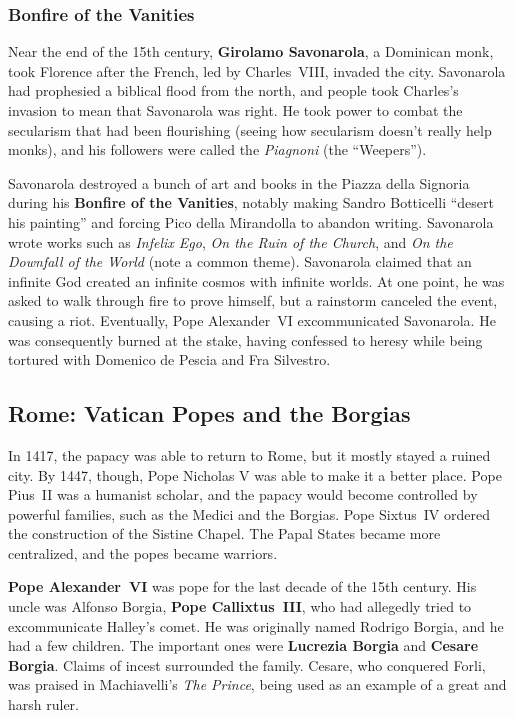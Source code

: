 \subsubsection*{Bonfire of the Vanities}

Near the end of the 15th century, \textbf{Girolamo Savonarola}, a Dominican monk,
took Florence after the French, led by Charles~VIII, invaded the city.
Savonarola had prophesied a biblical flood from the north,
and people took Charles's invasion to mean that Savonarola was right.
He took power to combat the secularism that had been flourishing
(seeing how secularism doesn't really help monks),
and his followers were called the \textit{Piagnoni} (the ``Weepers'').

Savonarola destroyed a bunch of art and books in the Piazza della Signoria
during his \textbf{Bonfire of the Vanities},
notably making Sandro Botticelli ``desert his painting''
and forcing Pico della Mirandolla to abandon writing.
Savonarola wrote works such as
\textit{Infelix Ego},
\textit{On the Ruin of the Church},
and \textit{On the Downfall of the World} (note a common theme).
Savonarola claimed that an infinite God created an infinite cosmos with infinite worlds.
At one point, he was asked to walk through fire to prove himself,
but a rainstorm canceled the event, causing a riot.
Eventually, Pope Alexander~VI excommunicated Savonarola.
He was consequently burned at the stake,
having confessed to heresy while being tortured with Domenico de Pescia and Fra Silvestro.

\subsection*{Rome: Vatican Popes and the Borgias}

In 1417, the papacy was able to return to Rome, but it mostly stayed a ruined city.
By 1447, though, Pope Nicholas V was able to make it a better place.
Pope Pius~II was a humanist scholar, and the papacy would become controlled by powerful families,
such as the Medici and the Borgias.
Pope Sixtus~IV ordered the construction of the Sistine Chapel.
The Papal States became more centralized, and the popes became warriors.

\textbf{Pope Alexander~VI} was pope for the last decade of the 15th century.
His uncle was Alfonso Borgia, \textbf{Pope Callixtus~III},
who had allegedly tried to excommunicate Halley's comet.
He was originally named Rodrigo Borgia, and he had a few children.
The important ones were \textbf{Lucrezia Borgia} and \textbf{Cesare Borgia}.
Claims of incest surrounded the family.
Cesare, who conquered Forli, was praised in Machiavelli's \textit{The Prince},
being used as an example of a great and harsh ruler.

